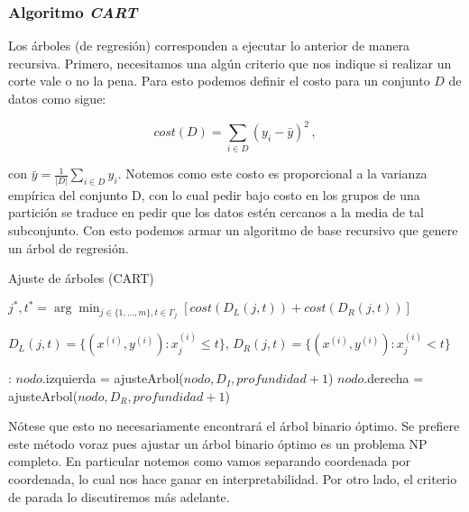 


\subsubsection{Algoritmo \textit{CART}}

Los árboles (de regresión) corresponden a ejecutar lo anterior de manera recursiva. Primero, necesitamos una algún criterio que nos indique si realizar un corte vale o no la pena. Para esto podemos definir el costo para un conjunto $D$ de datos como sigue:

\begin{equation}
    cost(D) = \sum_{i \in D} (y_i - \bar y)^2 \,,
\end{equation}

con $\bar y = \frac{1}{|D|} \sum_{i \in D} y_i $. Notemos como este costo es proporcional a la varianza empírica del conjunto D, con lo cual pedir bajo costo en los grupos de una partición se traduce en pedir que los datos estén cercanos a la media de tal subconjunto. Con esto podemos armar un algoritmo de base recursivo que genere un árbol de regresión.


\begin{algorithm}[H]
  \caption{Ajuste de árboles (CART)
    \label{DBSCAN}}
  \begin{algorithmic}[1]
      \State $j^*, t^* = \arg\min_{j \in \{1,\dots,m\}, t \in \Gamma_j} \left[ cost(D_L(j,t)) + cost(D_R(j,t)) \right]$

        $D_L(j,t) = \{(x^{(i)}, y^{(i)}) : x_j^{(i)} \leq t \}$, $D_R(j,t) = \{(x^{(i)}, y^{(i)}) : x_j^{(i)} < t \}$
      
      :
      \Else
        \State $nodo$.izquierda = ajusteArbol($nodo, D_I, profundidad + 1$)
        \State $nodo$.derecha = ajusteArbol($nodo, D_R, profundidad + 1$)
    \EndFunction
  \end{algorithmic}
\end{algorithm}

Nótese que esto no necesariamente encontrará el árbol binario óptimo. Se prefiere este método voraz pues ajustar un árbol binario óptimo es un problema NP completo. En particular notemos como vamos separando coordenada por coordenada, lo cual nos hace ganar en interpretabilidad. Por otro lado, el 
 criterio de parada lo discutiremos más adelante.

